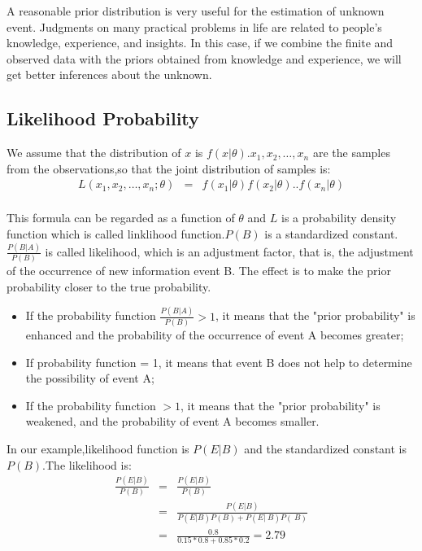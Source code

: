 A reasonable prior distribution is very useful for the estimation of unknown event. Judgments on many practical problems in life are related to people's knowledge, experience, and insights. In this case, if we combine the finite and observed data with the priors obtained from knowledge and experience, we will get better inferences about the unknown.



\subsection{Likelihood Probability}
We assume that the distribution of $x$ is $f(x|\theta)$.$x_1,x_2,\dots,x_n$  are the samples from the observations,so that the joint distribution of samples is:
\begin{eqnarray*}
L(x_1,x_2,\dots,x_n;\theta) &=& f(x_1|\theta)f(x_2|\theta)..f(x_n|\theta) \\
\end{eqnarray*}

This formula  can be regarded as a function of $\theta$ and $L$ is a probability density function which is called linklihood function.$P(B)$ is a standardized constant.
$\frac{P(B|A)}{P(B)}$ is called likelihood, which is an adjustment factor, that is, the adjustment of the occurrence of new information event B. The effect is to make the prior probability closer to the true probability.
\begin{itemize}
  \item If the probability function $\frac{P(B|A)}{P(B)}>1$, it means that the "prior probability" is enhanced and the probability of the occurrence of event A becomes greater;
  \item If probability function = 1, it means that event B does not help to determine the possibility of event A;
  \item If the probability function $> 1$, it means that the "prior probability" is weakened, and the probability of event A becomes smaller.
\end{itemize}

In our example,likelihood function is $P(E|B)$ and the standardized constant is $P(B)$.The likelihood is:
\begin{eqnarray*}
  \frac{P(E|B)}{P(B)}  &=& \frac{P(E|B)}{P(B)}  \\
  & = & \frac{P(E|B)}{P(E|B)P(B)+P(E|~B)P(~B)} \\
  & = & \frac{0.8}{0.15*0.8 + 0.85 * 0.2} = 2.79\\
\end{eqnarray*}

